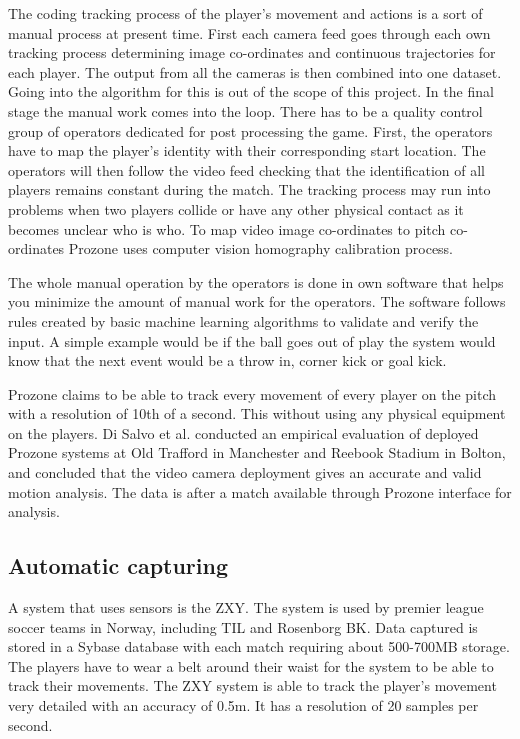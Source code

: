 The coding tracking process of the player's movement and actions is a sort of manual process at present time. First each camera feed goes through each own tracking process determining image co-ordinates and continuous trajectories for each player. The output from all the cameras is then combined into one dataset. Going into the algorithm for this is out of the scope of this project. In the final stage the manual work comes into the loop. There has to be a quality control group of operators dedicated for post processing the game. First, the operators have to map the player’s identity with their corresponding start location. The operators will then follow the video feed checking that the identification of all players remains constant during the match. The tracking process may run into problems when two players collide or have any other physical contact as it becomes unclear who is who. To map video image co-ordinates to pitch co-ordinates Prozone uses computer vision homography calibration process.

The whole manual operation by the operators is done in own software that helps you minimize the amount of manual work for the operators. The software follows rules created by basic machine learning algorithms to validate and verify the input. A simple example would be if the ball goes out of play the system would know that the next event would be a throw in, corner kick or goal kick.

Prozone claims to be able to track every movement of every player on the pitch with a resolution of 10th of a second. This without using any physical equipment on the players. Di Salvo et al. \cite{Prozone:validation} conducted an empirical evaluation of deployed Prozone systems at Old Trafford in Manchester and Reebook Stadium in Bolton, and concluded that the video camera deployment gives an accurate and valid motion analysis. The data is after a match available through Prozone interface for analysis. 

\subsection{Automatic capturing}

A system that uses sensors is the \ac{ZXY}. The system is used by premier league soccer teams in Norway, including \ac{TIL} and Rosenborg BK. Data captured is stored in a Sybase database with each match requiring about 500-700MB storage. The players have to wear a belt around their waist for the system to be able to track their movements. The ZXY system is able to track the player’s movement very detailed with an accuracy of 0.5m. It has a resolution of 20 samples per second. 

